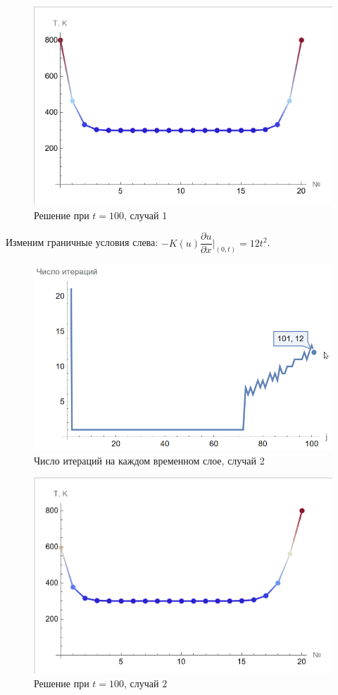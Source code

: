 \documentclass[12pt, a4paper]{article}
\begin{document}
\begin{figure}[H]
	\centering
	\includegraphics[width=1\textwidth]{iterations1sol}
	\caption{Решение при $t=100$, случай 1}
\end{figure}
	
	Изменим граничные условия слева: $-K(u)\dfrac{\partial u}{\partial x}|_{(0,t)}=12t^2$.
	
	\begin{figure}[H]
		\centering
		\includegraphics[width=1\textwidth]{iterations2}
		\caption{Число итераций на каждом временном слое, случай 2}
	\end{figure}
	
	\begin{figure}[H]
		\centering
		\includegraphics[width=1\textwidth]{iterations2sol}
		\caption{Решение при $t=100$, случай 2}
	\end{figure}
\end{document}
